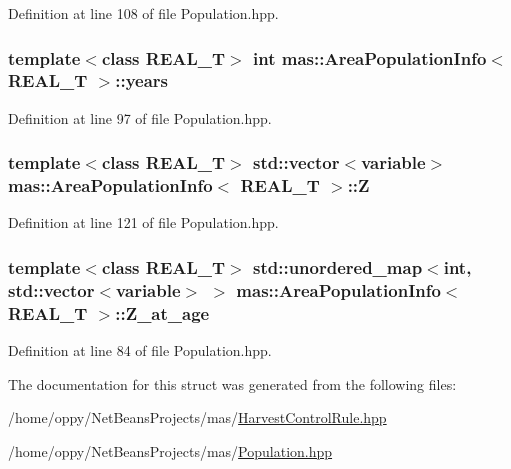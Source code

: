 Definition at line 108 of file Population.\-hpp.

\hypertarget{structmas_1_1_area_population_info_a13a36cb1ecbd6fdcae5959989aeb4da9}{
\subsubsection[{years}]{\setlength{\rightskip}{0pt plus 5cm}template$<$class R\-E\-A\-L\-\_\-\-T$>$ int {\bf mas\-::\-Area\-Population\-Info}$<$ R\-E\-A\-L\-\_\-\-T $>$\-::years}}\label{structmas_1_1_area_population_info_a13a36cb1ecbd6fdcae5959989aeb4da9}


Definition at line 97 of file Population.\-hpp.

\hypertarget{structmas_1_1_area_population_info_a5eedff2d62eea8538560489f556abbc6}{
\subsubsection[{Z}]{\setlength{\rightskip}{0pt plus 5cm}template$<$class R\-E\-A\-L\-\_\-\-T$>$ std\-::vector$<${\bf variable}$>$ {\bf mas\-::\-Area\-Population\-Info}$<$ R\-E\-A\-L\-\_\-\-T $>$\-::Z}}\label{structmas_1_1_area_population_info_a5eedff2d62eea8538560489f556abbc6}


Definition at line 121 of file Population.\-hpp.

\hypertarget{structmas_1_1_area_population_info_aa31c41581f5ce29f5041d104c096407e}{
\subsubsection[{Z\-\_\-at\-\_\-age}]{\setlength{\rightskip}{0pt plus 5cm}template$<$class R\-E\-A\-L\-\_\-\-T$>$ std\-::unordered\-\_\-map$<$int, std\-::vector$<${\bf variable}$>$ $>$ {\bf mas\-::\-Area\-Population\-Info}$<$ R\-E\-A\-L\-\_\-\-T $>$\-::Z\-\_\-at\-\_\-age}}\label{structmas_1_1_area_population_info_aa31c41581f5ce29f5041d104c096407e}


Definition at line 84 of file Population.\-hpp.



The documentation for this struct was generated from the following files\-:\begin{DoxyCompactItemize}
\item 
/home/oppy/\-Net\-Beans\-Projects/mas/\hyperlink{_harvest_control_rule_8hpp}{Harvest\-Control\-Rule.\-hpp}\item 
/home/oppy/\-Net\-Beans\-Projects/mas/\hyperlink{_population_8hpp}{Population.\-hpp}\end{DoxyCompactItemize}

